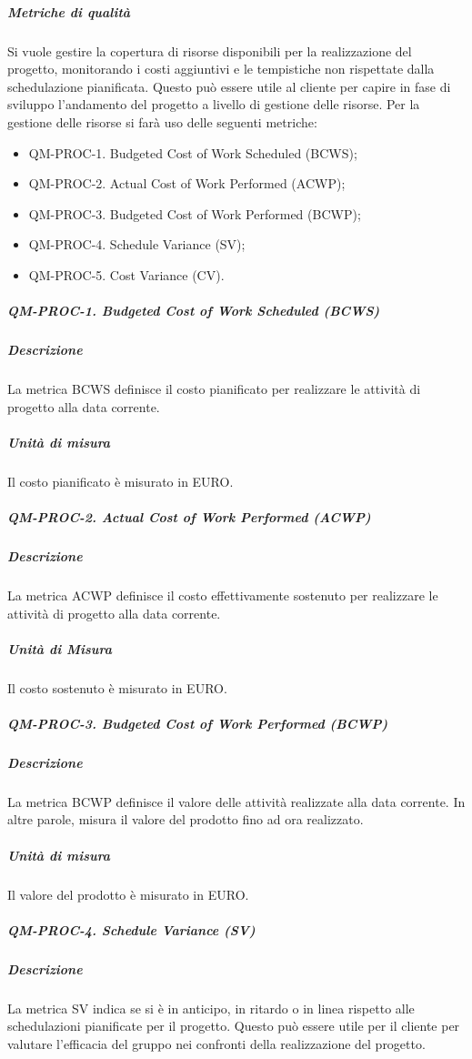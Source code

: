 		\subparagraph{Metriche di qualità}
			Si vuole gestire la copertura di risorse disponibili per la realizzazione del progetto, monitorando i costi aggiuntivi e le tempistiche non rispettate dalla schedulazione pianificata. Questo può essere utile al cliente per capire in fase di sviluppo l'andamento del progetto a livello di gestione delle risorse.
			Per la gestione delle risorse si farà uso delle seguenti metriche:

				\begin{itemize}
					\item QM-PROC-1. Budgeted Cost of Work Scheduled (BCWS);
					\item QM-PROC-2. Actual Cost of Work Performed (ACWP);
					\item QM-PROC-3. Budgeted Cost of Work Performed (BCWP);
					\item QM-PROC-4. Schedule Variance (SV);
					\item QM-PROC-5. Cost Variance (CV).
				\end{itemize}

			\subparagraph{QM-PROC-1. Budgeted Cost of Work Scheduled (BCWS)}

				\subparagraph{Descrizione}
				La metrica BCWS definisce il costo pianificato per realizzare le attività di progetto alla data corrente. 

				\subparagraph{Unità di misura}
				Il costo pianificato è misurato in EURO. 

			\subparagraph{QM-PROC-2. Actual Cost of Work Performed (ACWP)}

				\subparagraph{Descrizione}
				La metrica ACWP definisce il costo effettivamente sostenuto per realizzare le attività di progetto alla data corrente. 

				\subparagraph{Unità di Misura}
				Il costo sostenuto è misurato in EURO. 

			\subparagraph{QM-PROC-3. Budgeted Cost of Work Performed (BCWP)}

				\subparagraph{Descrizione}
				La metrica BCWP definisce il valore delle attività realizzate alla data corrente. In altre parole, misura il valore del prodotto fino ad ora realizzato. 

				\subparagraph{Unità di misura}
				Il valore del prodotto è misurato in EURO. 

			\subparagraph{QM-PROC-4. Schedule Variance (SV)}

				\subparagraph{Descrizione}
				La metrica SV indica se si è in anticipo, in ritardo o in linea rispetto alle schedulazioni pianificate per il progetto. Questo può essere utile per il cliente per valutare l'efficacia del gruppo nei confronti della realizzazione del progetto. 

